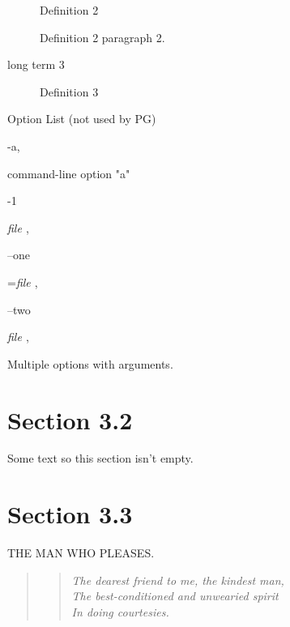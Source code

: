 \documentclass[a5paper]{book}
\begin{document}
\begin{german}
\begin{description}
Definition 2\par

Definition 2 paragraph 2.\par

\item[long term 3] 

Definition 3\par
\end{description}

Option List (not used by PG)\par

-a, 

command-line option "a"\par

-1

 {\itshape{
{\itshape{file
}}}}, 

--one

={\itshape{
{\itshape{file
}}}}, 

--two

 {\itshape{
{\itshape{file
}}}}, 

Multiple options with arguments.\par

%
\label{section-3-2}%
\hypertarget{section-3-2}{}%
%
\section*{
Section 3.2\footnotemark[7]}



Some text so this section isn’t empty.\par

%
\label{section-3-3}%
\hypertarget{section-3-3}{}%
%
\section*{Section 3.3}


\vspace{1em}
\begin{center}
THE MAN WHO PLEASES.
\end{center}

\vspace{2em}
\begin{container}
\begin{quotation}
\begin{verse}
{\itshape{The dearest friend to me, the kindest man,
}} \\
{\itshape{The best-conditioned and unwearied spirit
}} \\
{\itshape{In doing courtesies.
}} \\
\end{verse}


\end{quotation}
\end{container}
\end{german}
\end{document}
